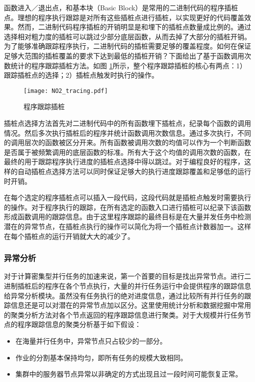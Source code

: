 函数进入／退出点，和基本块（Basic Block）是常用的二进制代码的程序插桩点。理想的程序执行跟踪是对所有这些插桩点进行插桩，以实现更好的代码覆盖效果。然而，二进制代码程序插桩的开销明显是和埋下的插桩点数量成比例的。通过选择相对粗力度的插桩可以跳过少部分底层函数，从而去掉了大部分的插桩开销。为了能够准确跟踪程序执行，二进制代码的插桩需要足够的覆盖程度。如何在保证足够大范围的插桩覆盖的要求下达到最低的插桩开销？下面给出了基于函数调用次数统计的程序跟踪插桩方法。如图 \ref{figure:tracing}所示，整个程序跟踪插桩的核心有两点：1）跟踪插桩点的选择；2）插桩点触发时执行的操作。
\begin{figure}
  \centering
  \texttt{[image: NO2\_tracing.pdf]}
  \caption{程序跟踪插桩}
  \label{figure:tracing}
\end{figure}

插桩点选择方法首先对二进制代码中的所有函数埋下插桩点，纪录每个函数的调用情况。然后多次执行插桩后的程序并统计函数调用次数信息。通过多次执行，不同的调用层次的函数被区分开来。所有函数被调用次数的均值可以作为一个判断函数是否属于被频繁调用的底层函数的标准。所有大于这个均值的调用次数的函数，在最终的用于跟踪程序执行进度的插桩点选择中得以跳过。对于编程良好的程序，这样的自动插桩点选择方法可以同时保证足够大的执行进度跟踪覆盖和足够低的运行时开销。

在每个选定的程序插桩点可以插入一段代码，这段代码就是插桩点触发时需要执行的操作。对于程序执行的跟踪，在所有选定的函数入口进行插桩可以纪录下该函数形成函数调用的跟踪信息。由于这里程序跟踪的最终目标是在大量并发任务中检测潜在的异常节点，在插桩点执行的操作可以简化为将一个插桩点计数器加一。这样在每个插桩点的运行开销就大大的减少了。

\subsubsection{异常分析}
\label{subsec:no2_clustering}
对于计算密集型并行任务的加速来说，第一个首要的目标是找出异常节点。进行二进制插桩后的程序在各个节点执行，大量的并行任务运行中会提供程序的跟踪信息给异常分析模块。虽然没有任务执行的绝对进度信息，通过比较所有并行任务的跟踪信息还是可以对潜在的异常节点加以区分。这里使用统计分析和数据挖掘中常用的聚类分析方法对各个节点返回的程序跟踪信息进行聚类。对于大规模并行任务节点的程序跟踪信息的聚类分析基于如下假设：
\begin{itemize}
\item 在海量并行任务中，异常节点只占较少的一部分。
\item 作业的分割基本保持均匀，即所有任务的规模大致相同。
\item 集群中的服务器节点异常以非确定的方式出现且过一段时间可能恢复正常。
\end{itemize}

